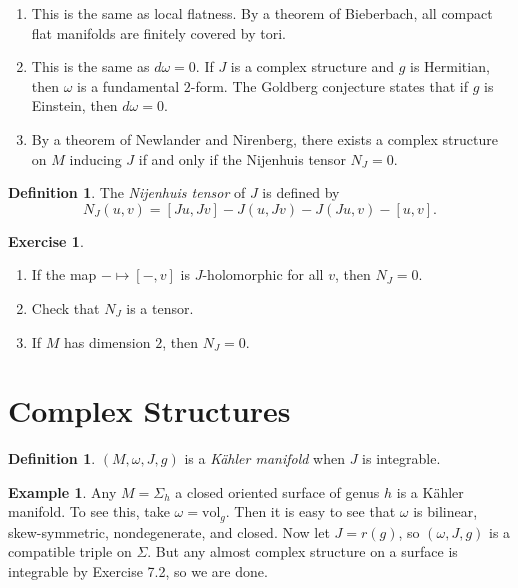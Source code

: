 \documentclass[leqno, openany]{memoir}
\theoremstyle{definition}
\newtheorem{defn}[thm]{Definition}
\newtheorem{exm}[thm]{Example}
\newtheorem{exer}[thm]{Exercise}
\theoremstyle{remark}
\theoremstyle{plain}
\theoremstyle{definition}
\theoremstyle{remark}
\newcommand{\mr}[1]{\mathrm{#1}}
\begin{document}
\begin{enumerate} \item This is the same as local flatness. By a theorem of
    Bieberbach, all compact flat manifolds are finitely covered by tori.  \item
    This is the same as $d\omega = 0$. If $J$ is a complex structure and $g$ is
    Hermitian, then $\omega$ is a fundamental $2$-form. The Goldberg conjecture
    states that if $g$ is Einstein, then $d\omega = 0$.  \item By a theorem of
    Newlander and Nirenberg, there exists a complex structure on $M$ inducing
    $J$ if and only if the Nijenhuis tensor $N_J = 0$.  \end{enumerate}

\begin{defn} The \textit{Nijenhuis tensor} of $J$ is defined by \[ N_J(u, v) =
[Ju, Jv] - J(u, Jv) - J(Ju, v) - [u, v]. \] \end{defn}

\begin{exer} \begin{enumerate} \item If the map $- \mapsto [-, v]$ is
$J$-holomorphic for all $v$, then $N_J = 0$.  \item Check that $N_J$ is a
tensor.  \item If $M$ has dimension $2$, then $N_J = 0$.  \end{enumerate}
\end{exer}

\section{Complex Structures}%

\begin{defn} $(M, \omega, J, g)$ is a \textit{K\"ahler manifold} when $J$ is
integrable.  \end{defn}

\begin{exm} Any $M = \Sigma_h$ a closed oriented surface of genus $h$ is a
    K\"ahler manifold. To see this, take $\omega = \mr{vol}_g$. Then it is easy
    to see that $\omega$ is bilinear, skew-symmetric, nondegenerate, and
    closed. Now let $J = r(g)$, so $(\omega, J, g)$ is a compatible triple on
    $\Sigma$. But any almost complex structure on a surface is integrable by
    Exercise 7.2, so we are done.  \end{exm}
\end{document}
